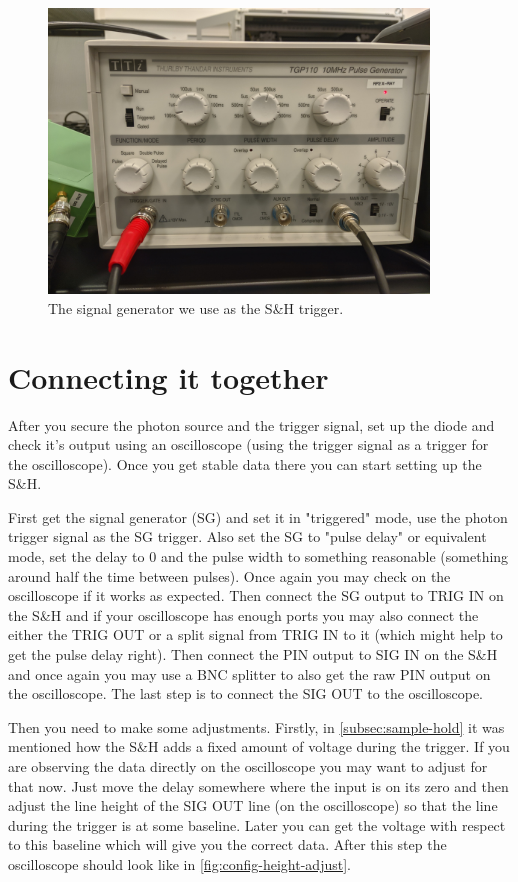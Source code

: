\documentclass[a4paper, 10pt]{article}
\begin{document}
\begin{figure}[H]
    \centering
    \includegraphics[width=0.9\textwidth]{./images/signal-generator.jpg}
    \caption{The signal generator we use as the S\&H trigger.}
    \label{fig:signal-generator}
\end{figure}

\section{Connecting it together}\label{sec:connecting}
After you secure the photon source and the trigger signal, set up the diode and check it's output using an oscilloscope (using the trigger signal as a trigger for the oscilloscope).
Once you get stable data there you can start setting up the S\&H.

First get the signal generator (SG) and set it in "triggered" mode, use the photon trigger signal as the SG trigger.
Also set the SG to "pulse delay" or equivalent mode, set the delay to 0 and the pulse width to something reasonable (something around half the time between pulses).
Once again you may check on the oscilloscope if it works as expected.
Then connect the SG output to TRIG IN on the S\&H and if your oscilloscope has enough ports you may also connect the either the TRIG OUT or a split signal from TRIG IN to it (which might help to get the pulse delay right).
Then connect the PIN output to SIG IN on the S\&H and once again you may use a BNC splitter to also get the raw PIN output on the oscilloscope.
The last step is to connect the SIG OUT to the oscilloscope.

Then you need to make some adjustments.
Firstly, in \cref{subsec:sample-hold} it was mentioned how the S\&H adds a fixed amount of voltage during the trigger.
If you are observing the data directly on the oscilloscope you may want to adjust for that now.
Just move the delay somewhere where the input is on its zero and then adjust the line height of the SIG OUT line (on the oscilloscope) so that the line during the trigger is at some baseline.
Later you can get the voltage with respect to this baseline which will give you the correct data.
After this step the oscilloscope should look like in \cref{fig:config-height-adjust}.
\end{document}
